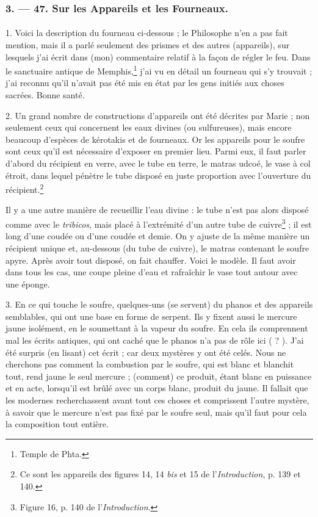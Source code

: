 \documentclass[a4paper, 11pt, oneside, polutonikogreek, french]{article}
\begin{document}
\bigskip
\centerline{\EightStarTaper}
\centerline{\EightStarTaper\EightStarTaper}
\bigskip

\subsubsection{3. --- 47. Sur les Appareils et les Fourneaux.}
\paragraph{}
1. Voici la description du fourneau ci-dessous ; le Philosophe n'en a pas fait mention, mais il a parlé seulement des prismes et des autres (appareils), sur lesquels j'ai écrit dans (mon) commentaire relatif à la façon de régler le feu. Dans le sanctuaire antique de Memphis,\footnote{Temple de Phta.} j'ai vu en détail un fourneau qui s'y trouvait ; j'ai reconnu qu'il n'avait pas été mis en état par les gens initiés aux choses sacrées. Bonne santé.

2. Un grand nombre de constructions d'appareils ont été décrites par Marie ; non seulement ceux qui concernent les eaux divines (ou sulfureuses), mais encore beaucoup d'espèces de kérotakis et de fourneaux. Or les appareils pour le soufre sont ceux qu'il est nécessaire d'exposer en premier lieu. Parmi eux, il faut parler d'abord du récipient en verre, avec le tube en terre, le matras udcoé, le vase à col étroit, dans lequel pénètre le tube disposé en juste proportion avec l'ouverture du récipient.\footnote{Ce sont les appareils des figures 14, 14 \emph{bis} et 15 de l'\emph{Introduction}, p. 139 et 140.}

Il y a une autre manière de recueillir l'eau divine : le tube n'est pas alors disposé comme avec le \emph{tribicos}, mais placé à l'extrémité d'un autre tube de cuivre\footnote{Figure 16, p. 140 de l'\emph{Introduction}.} ; il est long d'une coudée ou d'une coudée et demie. On y ajuste de la même manière un récipient unique et, au-dessous (du tube de cuivre), le matras contenant le soufre apyre. Après avoir tout disposé, on fait chauffer. Voici le modèle. Il faut avoir dans tous les cas, une coupe pleine d'eau et rafraîchir le vase tout autour avec une éponge.

3. En ce qui touche le soufre, quelques-uns (se servent) du phanos et des appareils semblables, qui ont une base en forme de serpent. Ils y fixent aussi le mercure jaune isolément, en le soumettant à la vapeur du soufre. En cela ils comprennent mal les écrits antiques, qui ont caché que le phanos n'a pas de rôle ici ( ? ). J'ai été surpris (en lisant) cet écrit ; car deux mystères y ont été celés. Nous ne cherchons pas comment la combustion par le soufre, qui est blanc et blanchit tout, rend jaune le seul mercure ; (comment) ce produit, étant blanc en puissance et en acte, lorsqu'il est brûlé avec un corps blanc, produit du jaune. Il fallait que les modernes recherchassent avant tout ces choses et comprissent l'autre mystère, à savoir que le mercure n'est pas fixé par le soufre seul, mais qu'il faut pour cela la composition tout entière.
\end{document}
